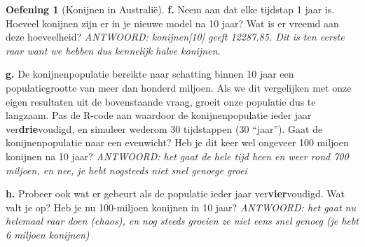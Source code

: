 \documentclass[
  a4paper,
]{scrbook}
\theoremstyle{definition}
\newtheorem{exercise}{Oefening}[chapter]
\theoremstyle{remark}
\begin{document}
\begin{exercise}[Konijnen in
Australië]
\textbf{f.} Neem aan dat elke tijdstap 1 jaar is. Hoeveel konijnen zijn
er in je nieuwe model na 10 jaar? Wat is er vreemd aan deze hoeveelheid?
\emph{ANTWOORD: konijnen{[}10{]} geeft 12287.85. Dit is ten eerste raar
want we hebben dus kennelijk halve konijnen.}

\textbf{g.} De konijnenpopulatie bereikte naar schatting binnen 10 jaar
een populatiegrootte van meer dan honderd miljoen. Als we dit
vergelijken met onze eigen resultaten uit de bovenstaande vraag, groeit
onze populatie dus te langzaam. Pas de R-code aan waardoor de
konijnenpopulatie ieder jaar ver\textbf{drie}voudigd, en simuleer
wederom 30 tijdstappen (30 ``jaar''). Gaat de konijnenpopulatie naar een
evenwicht? Heb je dit keer wel ongeveer 100 miljoen konijnen na 10 jaar?
\emph{ANTWOORD: het gaat de hele tijd heen en weer rond 700 miljoen, en
nee, je hebt nogsteeds niet snel genoege groei}

\textbf{h.} Probeer ook wat er gebeurt als de populatie ieder jaar
ver\textbf{vier}voudigd. Wat valt je op? Heb je nu 100-miljoen konijnen
in 10 jaar? \emph{ANTWOORD: het gaat nu helemaal raar doen (chaos), en
nog steeds groeien ze niet eens snel genoeg (je hebt 6 miljoen
konijnen)}

\end{exercise}
\end{document}
